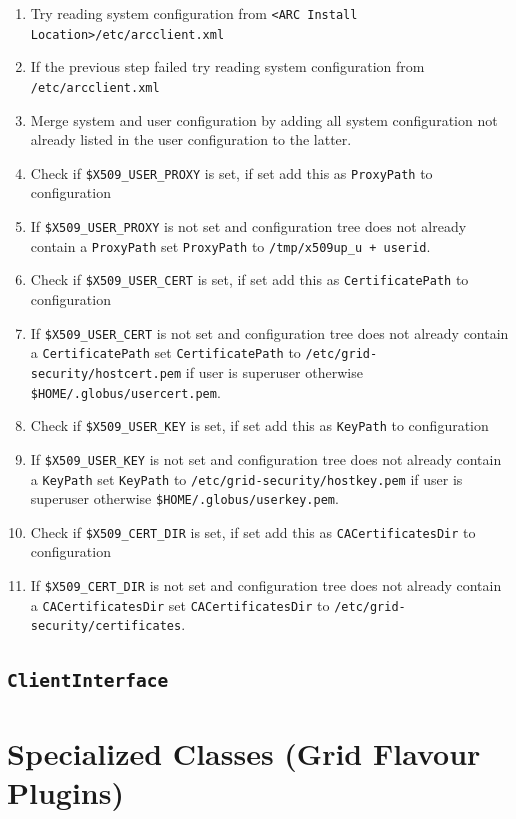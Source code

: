 \documentclass{book}
\newcommand{\ClientInterface}{\texttt{ClientInterface}}
\begin{document}
\begin{enumerate}
\item{Try reading system configuration from \texttt{<ARC Install Location>/etc/arcclient.xml}}
\item{If the previous step failed try reading system configuration from \texttt{/etc/arcclient.xml}}
\item{Merge system and user configuration by adding all system configuration not already listed 
in the user configuration to the latter.}
\item{Check if \texttt{\$X509\_USER\_PROXY} is set, if set add this as \texttt{ProxyPath} to configuration}
\item{If \texttt{\$X509\_USER\_PROXY} is not set and configuration tree does not already contain 
a \texttt{ProxyPath} set \texttt{ProxyPath} to \texttt{/tmp/x509up\_u + userid}.}
\item{Check if \texttt{\$X509\_USER\_CERT} is set, if set add this as \texttt{CertificatePath} to configuration}
\item{If \texttt{\$X509\_USER\_CERT} is not set and configuration tree does not already contain 
a \texttt{CertificatePath} set \texttt{CertificatePath} to \texttt{/etc/grid-security/hostcert.pem} 
if user is superuser otherwise \texttt{\$HOME/.globus/usercert.pem}.}
\item{Check if \texttt{\$X509\_USER\_KEY} is set, if set add this as \texttt{KeyPath} to configuration}
\item{If \texttt{\$X509\_USER\_KEY} is not set and configuration tree does not already contain 
a \texttt{KeyPath} set \texttt{KeyPath} to \texttt{/etc/grid-security/hostkey.pem} 
if user is superuser otherwise \texttt{\$HOME/.globus/userkey.pem}.}
\item{Check if \texttt{\$X509\_CERT\_DIR} is set, if set add this as \texttt{CACertificatesDir} to configuration}
\item{If \texttt{\$X509\_CERT\_DIR} is not set and configuration tree does not already contain 
a \texttt{CACertificatesDir} set \texttt{CACertificatesDir} to \texttt{/etc/grid-security/certificates}.}
\end{enumerate}

\subsection{{\ClientInterface}}

\section{Specialized Classes (Grid Flavour Plugins)}
\label{sec:plugins}
\end{document}
